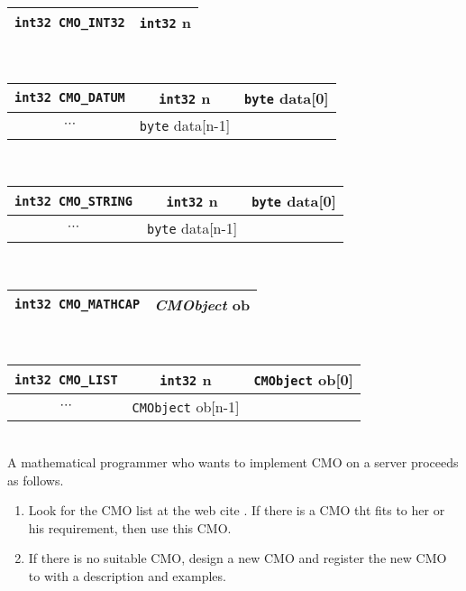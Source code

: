\begin{tabular}{|c|c|}
\hline
{\tt int32 CMO\_INT32}& {\tt int32} {\rm n}  \\ 
\hline
\end{tabular} \\
\begin{tabular}{|c|c|c|}
\hline
{\tt int32 CMO\_DATUM}& {\tt int32} {\rm n} & {\tt byte} {\rm  data[0]} \\
\hline
$\cdots$ & {\tt byte} {\rm  data[n-1]} \\ 
\cline{1-2}
\end{tabular} \\
\begin{tabular}{|c|c|c|}
\hline
{\tt int32 CMO\_STRING}& {\tt int32} {\rm n} & {\tt byte} {\rm data[0]} \\
\hline
$\cdots$ & {\tt byte} {\rm data[n-1]} \\ 
\cline{1-2}
\end{tabular} \\
\begin{tabular}{|c|c|}
\hline
{\tt int32 CMO\_MATHCAP} & {\it CMObject} {\rm ob} \\ 
\hline
\end{tabular} \\
\begin{tabular}{|c|c|c|}
\hline
{\tt int32 CMO\_LIST}& {\tt int32} {\rm n} & {\tt CMObject} {\rm ob[0]} \\
\hline
$\cdots$ & {\tt CMObject} {\rm ob[n-1]} \\ 
\cline{1-2}
\end{tabular} \\


A mathematical programmer who wants to implement CMO on a server proceeds 
as follows.
\begin{enumerate}
\item Look for the CMO list at the web cite \cite{openxm-web}.
If there is a CMO tht fits to her or his requirement, then use this CMO.     
\item If there is no suitable CMO, design a new CMO and register 
the new CMO to \cite{openxm-web} with a description and examples.
\end{enumerate}



